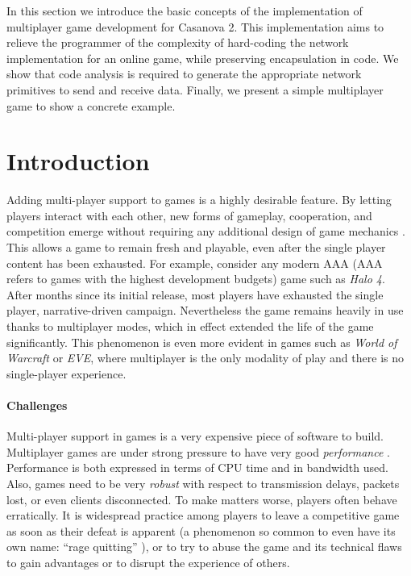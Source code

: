 In this section we introduce the basic concepts of the implementation of multiplayer game development for Casanova 2. This implementation aims to relieve the programmer of the complexity of hard-coding the network implementation for an online game, while preserving encapsulation in code. We show that code analysis is required to generate the appropriate network primitives to send and receive data. Finally, we present a simple multiplayer game to show a concrete example.

\section{Introduction}
Adding multi-player support to games is a highly desirable feature. By letting players interact with each other, new forms of gameplay, cooperation, and competition emerge without requiring any additional design of game mechanics \cite{granberg2014david}. This allows a game to remain fresh and playable, even after the single player content has been exhausted. For example, consider any modern AAA (AAA refers to games with the highest development budgets\cite{wolf2008video}) game such as \textit{Halo 4}. After months since its initial release, most players have exhausted the single player, narrative-driven campaign. Nevertheless the game remains heavily in use thanks to multiplayer modes, which in effect extended the life of the game significantly. This phenomenon is even more evident in games such as \textit{World of Warcraft} or \textit{EVE}, where multiplayer is the only modality of play and there is no single-player experience.

\paragraph{Challenges}
Multi-player support in games is a very expensive piece of software to build. Multiplayer games are under strong pressure to have very good \textit{performance} \cite{claypool2006latency}. Performance is both expressed in terms of CPU time and in bandwidth used. Also, games need to be very \textit{robust} with respect to transmission delays, packets lost, or even clients disconnected. To make matters worse, players often behave erratically. It is widespread practice among players to leave a competitive game as soon as their defeat is apparent (a phenomenon so common to even have its own name: ``rage quitting'' \cite{rage_quitting}), or to try to abuse the game and its technical flaws to gain advantages or to disrupt the experience of others.


